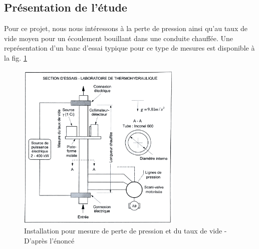 



\subsection{Présentation de l'étude}

Pour ce projet, nous nous intéressons à la perte de pression ainsi qu'au taux de vide moyen pour un écoulement bouillant dans une conduite chauffée. Une représentation d'un banc d'essai typique pour ce type de mesures est disponible à la fig. \ref{fig:instal}

\begin{figure}[ht]%
    \centering
    \includegraphics[width=0.7\textwidth]{images/schema_instal.png}
    \caption{Installation pour mesure de perte de pression et du taux de vide - D'après l'énoncé}
    \label{fig:instal}
\end{figure}

